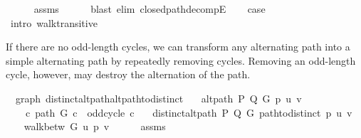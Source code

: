 \begin{isabellebody}
\ \ \ \ \isamarkupfalse%
\ assms{\isacharparenleft}{\kern0pt}{}{\isacharminus}{\kern0pt}{}{\isacharparenright}{\kern0pt}\isanewline
\ \ \ \ \isamarkupfalse%
\ {\isacharparenleft}{\kern0pt}blast\ elim{\isacharcolon}{\kern0pt}\ closed{\isacharunderscore}{\kern0pt}path{\isacharunderscore}{\kern0pt}decompE{\isacharunderscore}{\kern0pt}{}{\isacharparenright}{\kern0pt}\isanewline
\ \ \isamarkupfalse%
\ {\isacharquery}{\kern0pt}case\isanewline
\ \ \ \ \isamarkupfalse%
\ {\isacharparenleft}{\kern0pt}intro\ walk{\isacharunderscore}{\kern0pt}transitive{\isacharparenright}{\kern0pt}\isanewline
{}\isamarkupfalse%
%
\endisatagproof
{\isafoldproof}%
%
\isadelimproof
%
\endisadelimproof
%
\begin{isamarkuptext}%
If there are no odd-length cycles, we can transform any alternating path into a simple alternating
path by repeatedly removing cycles. Removing an odd-length cycle, however, may destroy the
alternation of the path.%
\end{isamarkuptext}\isamarkuptrue%
\isamarkupfalse%
\ {\isacharparenleft}{\kern0pt}\ graph{\isacharparenright}{\kern0pt}\ distinct{\isacharunderscore}{\kern0pt}alt{\isacharunderscore}{\kern0pt}path{\isacharunderscore}{\kern0pt}alt{\isacharunderscore}{\kern0pt}path{\isacharunderscore}{\kern0pt}to{\isacharunderscore}{\kern0pt}distinct{\isacharcolon}{\kern0pt}\isanewline
\ \ \ {\isachardoublequoteopen}alt{\isacharunderscore}{\kern0pt}path\ P\ Q\ G\ p\ u\ v{\isachardoublequoteclose}\isanewline
\ \ \ {\isachardoublequoteopen}{\isasymnot}\ {\isacharparenleft}{\kern0pt}{\isasymexists}c{\isachardot}{\kern0pt}\ path\ G\ c\ {\isasymand}\ odd{\isacharunderscore}{\kern0pt}cycle\ c{\isacharparenright}{\kern0pt}{\isachardoublequoteclose}\isanewline
\ \ \ {\isachardoublequoteopen}distinct{\isacharunderscore}{\kern0pt}alt{\isacharunderscore}{\kern0pt}path\ P\ Q\ G\ {\isacharparenleft}{\kern0pt}path{\isacharunderscore}{\kern0pt}to{\isacharunderscore}{\kern0pt}distinct\ p{\isacharparenright}{\kern0pt}\ u\ v{\isachardoublequoteclose}\isanewline
%
\isadelimproof
%
\endisadelimproof
%
\isatagproof
{}\isamarkupfalse%
\ {\isacharminus}{\kern0pt}\isanewline
\ \ \isamarkupfalse%
\ {\isachardoublequoteopen}walk{\isacharunderscore}{\kern0pt}betw\ G\ u\ p\ v{\isachardoublequoteclose}\isanewline
\ \ \ \ \isamarkupfalse%
\ assms{\isacharparenleft}{\kern0pt}{}{\isacharparenright}{\kern0pt}\isanewline

\end{isabellebody}
